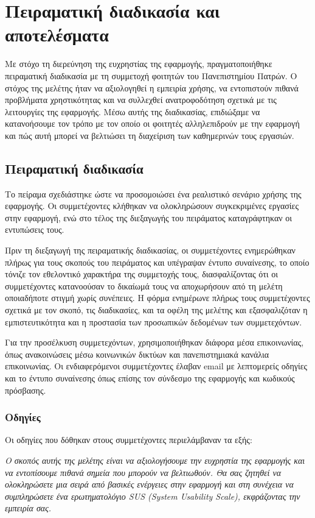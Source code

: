 \chapter{Πειραματική διαδικασία και αποτελέσματα}
    Με στόχο τη διερεύνηση της ευχρηστίας της εφαρμογής, πραγματοποιήθηκε πειραματική διαδικασία με τη συμμετοχή φοιτητών του Πανεπιστημίου Πατρών. Ο στόχος της μελέτης ήταν να αξιολογηθεί η εμπειρία χρήσης, να εντοπιστούν πιθανά προβλήματα χρηστικότητας και να συλλεχθεί ανατροφοδότηση σχετικά με τις λειτουργίες της εφαρμογής. Μέσω αυτής της διαδικασίας, επιδιώξαμε να κατανοήσουμε τον τρόπο με τον οποίο οι φοιτητές αλληλεπιδρούν με την εφαρμογή και πώς αυτή μπορεί να βελτιώσει τη διαχείριση των καθημερινών τους εργασιών.

    \section{Πειραματική διαδικασία}
        Το πείραμα σχεδιάστηκε ώστε να προσομοιώσει ένα ρεαλιστικό σενάριο χρήσης της εφαρμογής. Οι συμμετέχοντες κλήθηκαν να ολοκληρώσουν συγκεκριμένες εργασίες στην εφαρμογή, ενώ στο τέλος της διεξαγωγής του πειράματος καταγράφτηκαν οι εντυπώσεις τους.

        Πριν τη διεξαγωγή της πειραματικής διαδικασίας, οι συμμετέχοντες ενημερώθηκαν πλήρως για τους σκοπούς του πειράματος και υπέγραψαν έντυπο συναίνεσης, το οποίο τόνιζε τον εθελοντικό χαρακτήρα της συμμετοχής τους, διασφαλίζοντας ότι οι συμμετέχοντες κατανοούσαν το δικαίωμά τους να αποχωρήσουν από τη μελέτη οποιαδήποτε στιγμή χωρίς συνέπειες. Η φόρμα ενημέρωνε πλήρως τους συμμετέχοντες σχετικά με τον σκοπό, τις διαδικασίες, και τα οφέλη της μελέτης και εξασφαλιζόταν η εμπιστευτικότητα και η προστασία των προσωπικών δεδομένων των συμμετεχόντων.

        Για την προσέλκυση συμμετεχόντων, χρησιμοποιήθηκαν διάφορα μέσα επικοινωνίας, όπως ανακοινώσεις μέσω κοινωνικών δικτύων και πανεπιστημιακά κανάλια επικοινωνίας. Οι ενδιαφερόμενοι συμμετέχοντες έλαβαν email με λεπτομερείς οδηγίες και το έντυπο συναίνεσης όπως επίσης τον σύνδεσμο της εφαρμογής και κωδικούς πρόσβασης.

        \subsection{Οδηγίες}
            Οι οδηγίες που δόθηκαν στους συμμετέχοντες περιελάμβαναν τα εξής:

            \textit{Ο σκοπός αυτής της μελέτης είναι να αξιολογήσουμε την ευχρηστία της εφαρμογής και να εντοπίσουμε πιθανά σημεία που μπορούν να βελτιωθούν. Θα σας ζητηθεί να ολοκληρώσετε μια σειρά από βασικές ενέργειες στην εφαρμογή και στη συνέχεια να συμπληρώσετε ένα ερωτηματολόγιο SUS (System Usability Scale), εκφράζοντας την εμπειρία σας.}

